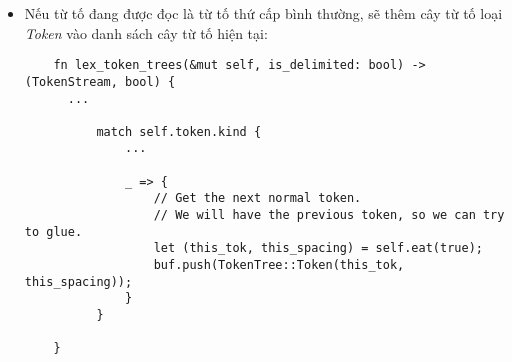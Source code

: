 \begin{itemize}
\begin{lstlisting}
              ...
          }
  
    }
  \end{lstlisting}
  \item Nếu từ tố đang được đọc là từ tố thứ cấp bình thường, sẽ thêm cây từ tố loại \textit{Token} vào danh sách cây từ tố hiện tại:
  \begin{lstlisting}
    fn lex_token_trees(&mut self, is_delimited: bool) -> (TokenStream, bool) {
      ...
  
          match self.token.kind {
              ...

              _ => {
                  // Get the next normal token.
                  // We will have the previous token, so we can try to glue.
                  let (this_tok, this_spacing) = self.eat(true);
                  buf.push(TokenTree::Token(this_tok, this_spacing));
              }
          }
  
    }
  \end{lstlisting}
\end{itemize}